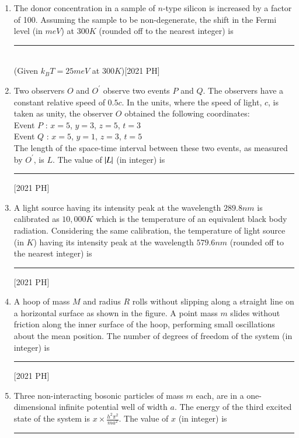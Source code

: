 \documentclass[journal]{IEEEtran}
\begin{document}
\begin{enumerate}
    \item The donor concentration in a sample of $n$-type silicon is increased by a factor
of 100. Assuming the sample to be non-degenerate, the shift in the Fermi
level (in $meV$) at $300 K$ (rounded off to the nearest integer) is \rule{2cm}{0.4pt}\\ (Given $k_BT = 25 meV$ at $300K$)\hfill [2021 PH]
\item Two observers $O$ and $O^\prime$ observe two events $P$ and $Q$. The observers have a
constant relative speed of $0.5c$. In the units, where the speed of light, $c$, is
taken as unity, the observer $O$ obtained the following coordinates: \\
Event $P$ : $x = 5$, $y = 3$, $z = 5$, $t = 3$ \\
Event $Q$ : $x = 5$, $y = 1$, $z = 3$, $t = 5$\\
The length of the space-time interval between these two events, as measured by $O^\prime$, is $L$. The value of $\left\vert L\right\vert$ (in integer) is \rule{2cm}{0.4pt}\hfill [2021 PH]
\item A light source having its intensity peak at the wavelength $289.8 nm$ is
calibrated as $10,000 K$ which is the temperature of an equivalent black body
radiation. Considering the same calibration, the temperature of light source
(in $K$) having its intensity peak at the wavelength $579.6 nm$ (rounded off to
the nearest integer) is \rule{2cm}{0.4pt}

\hfill [2021 PH]
\item A hoop of mass $M$ and radius $R$ rolls without slipping along a straight line
on a horizontal surface as shown in the figure. A point mass $m$ slides without
friction along the inner surface of the hoop, performing small oscillations
about the mean position. The number of degrees of freedom of the system
(in integer) is \rule{1.5cm}{0.4pt}

\hfill [2021 PH]

\item Three non-interacting bosonic particles of mass $m$ each, are in a one-
dimensional infinite potential well of width $a$. The energy of the third excited
state of the system is $x \times \frac{h^2 \pi^2}{ma^2}$. The value of $x$ (in integer) is \rule{2cm}{0.4pt} 


\end{enumerate}
\end{document}

